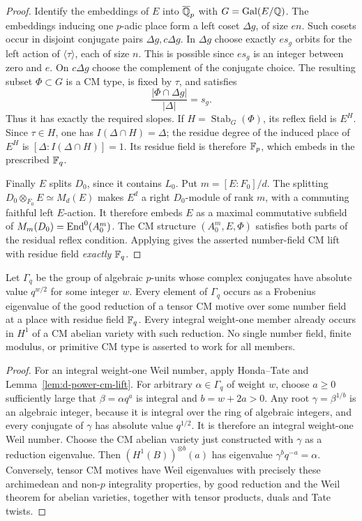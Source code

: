 \begin{proof}
Identify the embeddings of $E$ into $\overline{\mathbb Q}_p$ with
$G=\operatorname{Gal}(E/\mathbb Q)$.  The embeddings inducing one $p$-adic place form
a left coset $\Delta g$, of size $en$.  Such cosets occur in
disjoint conjugate pairs $\Delta g,c\Delta g$.  In $\Delta g$
choose exactly $e s_g$ orbits for the left action of
$\langle\tau\rangle$, each of size $n$.  This is possible since
$e s_g$ is an integer between zero and $e$.  On $c\Delta g$ choose
the complement of the conjugate choice.  The resulting subset
$\Phi\subset G$ is a CM type, is fixed by $\tau$, and satisfies
\[
 \frac{|\Phi\cap\Delta g|}{|\Delta|}=s_g.
\]
Thus it has exactly the required slopes.  If
$H=\operatorname{Stab}_G(\Phi)$, its reflex field is $E^H$.
Since $\tau\in H$, one has $I(\Delta\cap H)=\Delta$; the residue
degree of the induced place of $E^H$ is
$[\Delta:I(\Delta\cap H)]=1$.  Its residue field is therefore
$\mathbb F_p$, which embeds in the prescribed $\mathbb F_q$.

Finally $E$ splits $D_0$, since it contains $L_0$.  Put
$m=[E:F_0]/d$.  The splitting
$D_0\otimes_{F_0}E\simeq M_d(E)$ makes $E^d$ a right
$D_0$-module of rank $m$, with a commuting faithful left $E$-action.
It therefore embeds $E$ as a maximal commutative subfield of
$M_m(D_0)=\operatorname{End}^0(A_0^m)$.  The CM structure $(A_0^m,E,\Phi)$
satisfies both parts of the residual reflex condition.  Applying
\citet[Theorem 1.6, equivalently Proposition 5.4]{DCCO2008}
gives the asserted number-field CM lift with residue field
\emph{exactly} $\mathbb F_q$.
\end{proof}

\begin{corollary}
\label{cor:d-all-weil}
Let $\Gamma_q$ be the group of algebraic $p$-units whose complex
conjugates have absolute value $q^{w/2}$ for some integer $w$.
Every element of $\Gamma_q$ occurs as a Frobenius eigenvalue of the
good reduction of a tensor CM motive over some number field at a
place with residue field $\mathbb F_q$.  Every integral weight-one member
already occurs in $H^1$ of a CM abelian variety with such reduction.
No single number field, finite modulus, or primitive CM type is
asserted to work for all members.
\end{corollary}

\begin{proof}
For an integral weight-one Weil number, apply Honda--Tate and
Lemma~\ref{lem:d-power-cm-lift}.  For arbitrary $\alpha\in\Gamma_q$
of weight $w$, choose $a\geq0$ sufficiently large that
$\beta=\alpha q^a$ is integral and $b=w+2a>0$.  Any root
$\gamma=\beta^{1/b}$ is an algebraic integer, because it is
integral over the ring of algebraic integers, and every conjugate
of $\gamma$ has absolute value $q^{1/2}$.  It is therefore an
integral weight-one Weil number.  Choose the CM abelian variety
just constructed with $\gamma$ as a reduction eigenvalue.  Then
$(H^1(B))^{\otimes b}(a)$ has eigenvalue
$\gamma^bq^{-a}=\alpha$.  Conversely, tensor CM motives have Weil
eigenvalues with precisely these archimedean and non-$p$ integrality
properties, by good reduction and the Weil theorem for abelian
varieties, together with tensor products, duals and Tate twists.
\end{proof}

